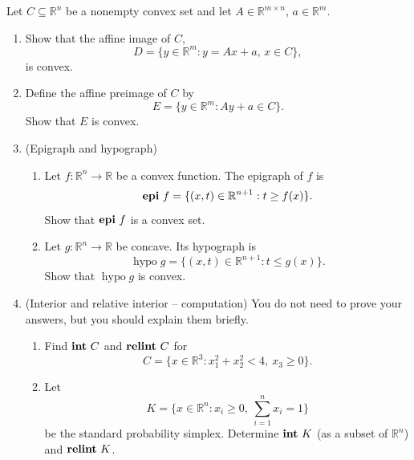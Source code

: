 \documentclass[11pt,letter,notitlepage]{article}
\DeclareMathOperator*{\relint}{\bf relint\,}
\DeclareMathOperator*{\intp}{\bf int\,}
\DeclareMathOperator*{\epi}{\bf epi\,}
\theoremstyle{definition}
\begin{document}
    \newpage

    \begin{exercise}
        Let \(C\subseteq\mathbb{R}^{n}\) be a nonempty convex set and let \(A\in\mathbb{R}^{m\times n}\), \(a\in\mathbb{R}^{m}\).
        \begin{enumerate}[label=(\arabic*)]
        \item Show that the affine image of \(C\),
        \[D=\{y\in\mathbb{R}^{m}:y=Ax+a,\,x\in C\},\]
        is convex.
        
        \item Define the affine preimage of \(C\) by
        \[E=\{y\in\mathbb{R}^{m}:Ay+a\in C\}.\]
        Show that \(E\) is convex.
        
        \item (Epigraph and hypograph)
        \begin{enumerate}[label=(\alph*)]
            \item Let \(f:\mathbb{R}^{n}\to\mathbb{R}\) be a convex function. The epigraph of \(f\) is 
            \[\epi f=\{(x,t)\in\mathbb{R}^{n+1}:t\geq f(x)\}.\]
            Show that \(\epi f\) is a convex set.
            \item Let \(g:\mathbb{R}^{n}\to\mathbb{R}\) be concave. Its hypograph is 
            \[\operatorname{hypo}g=\{(x,t)\in\mathbb{R}^{n+1}:t\leq g(x)\}.\]
            Show that \(\operatorname{hypo}g\) is convex.
        \end{enumerate}
        
        \item (Interior and relative interior -- computation) You do not need to prove your answers, but you should explain them briefly.
        \begin{enumerate}[label=(\alph*)]
            \item Find \(\intp C\) and \(\relint C\) for 
            \[C=\{x\in\mathbb{R}^{3}:x_{1}^{2}+x_{2}^{2}<4,\ x_{3}\geq 0\}.\]
            \item Let 
            \[K=\{x\in\mathbb{R}^{n}:x_{i}\geq 0,\ \sum_{i=1}^{n}x_{i}=1\}\]
            be the standard probability simplex. Determine \(\intp K\) (as a subset of \(\mathbb{R}^{n}\)) and \(\relint K\).
        \end{enumerate}
        \end{enumerate}
    \end{exercise}

    \newpage
\end{document}

